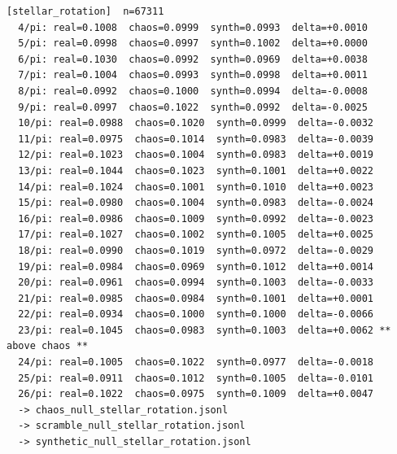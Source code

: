 \documentclass[11pt, letterpaper, openany]{book}
\begin{document}
\begin{empiricalbox}
\begin{lstlisting}[style=terminal]
[stellar_rotation]  n=67311
  4/pi: real=0.1008  chaos=0.0999  synth=0.0993  delta=+0.0010
  5/pi: real=0.0998  chaos=0.0997  synth=0.1002  delta=+0.0000
  6/pi: real=0.1030  chaos=0.0992  synth=0.0969  delta=+0.0038
  7/pi: real=0.1004  chaos=0.0993  synth=0.0998  delta=+0.0011
  8/pi: real=0.0992  chaos=0.1000  synth=0.0994  delta=-0.0008
  9/pi: real=0.0997  chaos=0.1022  synth=0.0992  delta=-0.0025
  10/pi: real=0.0988  chaos=0.1020  synth=0.0999  delta=-0.0032
  11/pi: real=0.0975  chaos=0.1014  synth=0.0983  delta=-0.0039
  12/pi: real=0.1023  chaos=0.1004  synth=0.0983  delta=+0.0019
  13/pi: real=0.1044  chaos=0.1023  synth=0.1001  delta=+0.0022
  14/pi: real=0.1024  chaos=0.1001  synth=0.1010  delta=+0.0023
  15/pi: real=0.0980  chaos=0.1004  synth=0.0983  delta=-0.0024
  16/pi: real=0.0986  chaos=0.1009  synth=0.0992  delta=-0.0023
  17/pi: real=0.1027  chaos=0.1002  synth=0.1005  delta=+0.0025
  18/pi: real=0.0990  chaos=0.1019  synth=0.0972  delta=-0.0029
  19/pi: real=0.0984  chaos=0.0969  synth=0.1012  delta=+0.0014
  20/pi: real=0.0961  chaos=0.0994  synth=0.1003  delta=-0.0033
  21/pi: real=0.0985  chaos=0.0984  synth=0.1001  delta=+0.0001
  22/pi: real=0.0934  chaos=0.1000  synth=0.1000  delta=-0.0066
  23/pi: real=0.1045  chaos=0.0983  synth=0.1003  delta=+0.0062 ** above chaos **
  24/pi: real=0.1005  chaos=0.1022  synth=0.0977  delta=-0.0018
  25/pi: real=0.0911  chaos=0.1012  synth=0.1005  delta=-0.0101
  26/pi: real=0.1022  chaos=0.0975  synth=0.1009  delta=+0.0047
  -> chaos_null_stellar_rotation.jsonl
  -> scramble_null_stellar_rotation.jsonl
  -> synthetic_null_stellar_rotation.jsonl


\end{lstlisting}
\end{empiricalbox}
\end{document}
